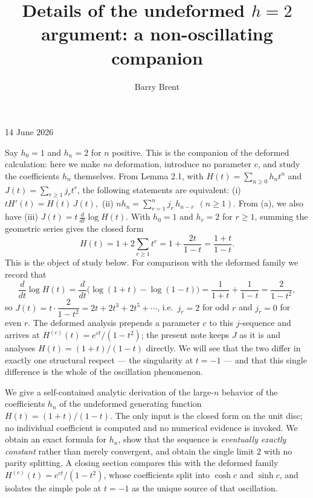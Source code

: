 \documentclass[11pt, fleqn]{amsart}
\title
{Details of the undeformed $h=2$ argument: a non-oscillating companion}
\author{Barry Brent}
\theoremstyle{remark}
\begin{document}
\maketitle
\vspace{-0.5em}
\begin{center}
    {14 June 2026}
\end{center}
\vspace{1em}
Say $h_0 = 1$ and $h_n = 2$ for $n$ positive. This is the companion of the deformed
calculation: here we make \emph{no} deformation, introduce no parameter $c$, and study
the coefficients $h_n$ themselves. From Lemma 2.1, with
$H(t) = \sum_{n\ge 0} h_n t^n$ and $J(t) = \sum_{r\ge 1} j_r t^r$,
the following statements are equivalent:
\newline
\newline
(i) $
  t H'(t) = H(t)\,J(t),
$ \newline
(ii) $
  n h_n = \sum_{r=1}^{n} j_r\, h_{n-r}\ \ (n \ge 1).
$ \newline \newline
From (a), we also have \newline
(iii)
$
  J(t) = t\,\frac{d}{dt}\log H(t).
$
\newline
\newline
With $h_0 = 1$ and $h_r = 2$ for $r \ge 1$, summing the geometric series gives the
closed form
$$
  H(t) = 1 + 2\sum_{r\ge 1} t^r = 1 + \frac{2t}{1-t} = \frac{1+t}{1-t}.
$$
This is the object of study below. For comparison with the deformed family we record
that
$$
  \frac{d}{dt}\log H(t)
    = \frac{d}{dt}\bigl(\log(1+t) - \log(1-t)\bigr)
    = \frac{1}{1+t} + \frac{1}{1-t}
    = \frac{2}{1-t^2},
$$
so $J(t) = t\cdot\dfrac{2}{1-t^2} = 2t + 2t^3 + 2t^5 + \cdots$, i.e.\ $j_r = 2$ for odd
$r$ and $j_r = 0$ for even $r$. The deformed analysis prepends a parameter $c$ to this
$j$-sequence and arrives at $H^{(c)}(t)=e^{ct}/(1-t^2)$; the present note keeps $J$ as
it is and analyses $H(t)=(1+t)/(1-t)$ directly. We will see that the two differ in
exactly one structural respect --- the singularity at $t=-1$ --- and that this single
difference is the whole of the oscillation phenomenon.

\medskip

We give a self-contained analytic derivation of the large-$n$ behavior of the
coefficients $h_n$ of the undeformed generating function $H(t)=(1+t)/(1-t)$. The only
input is the closed form on the unit disc; no individual coefficient is computed and no
numerical evidence is invoked. We obtain an exact formula for $h_n$, show that the
sequence is \emph{eventually exactly constant} rather than merely convergent, and obtain
the single limit $2$ with no parity splitting. A closing section compares this with the
deformed family $H^{(c)}(t)=e^{ct}/(1-t^2)$, whose coefficients split into $\cosh c$ and
$\sinh c$, and isolates the simple pole at $t=-1$ as the unique source of that
oscillation.
\end{document}
